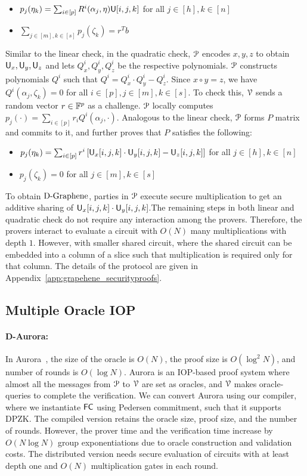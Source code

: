 \begin{itemize}
	\item $p_j(\eta_k) = \sum_{i\in[p]} R^i(\alpha_j, \eta) \mathsf{U}[i,j,k]$ for all $j \in [h], k \in [n]$
	\item $\sum_{j\in [m], k\in [s]} p_j (\zeta_k) = r^Tb$
\end{itemize}
%
Similar to the linear check, in the quadratic check, $\mathcal{P}$ encodes $x,y,z$ to obtain $\mathsf{U}_x, \mathsf{U}_y, \mathsf{U}_z$ and lets $Q^i_x, Q^i_y, Q^i_z$  be the respective polynomials. $\mathcal{P}$ constructs polynomials $Q^i$ such that $Q^i = Q^i_x\cdot Q^i_y - Q^i_z$. Since $x\circ y = z$, we have $Q^i(\alpha_j,\zeta_k) = 0$ for all $i\in[p], j\in[m], k\in[s]$. To check this, $\mathcal{V}$ sends a random vector $r\in \mathbb{F}^p$ as a challenge. $\mathcal{P}$ locally computes $p_j(\cdot) = \sum_{i \in [p]} r_i Q^i(\alpha_j, \cdot)$. Analogous to the linear check, $\mathcal{P}$ forms $P$ matrix and commits to it, and further proves that $P$ satisfies the following:
\begin{itemize}
	\item $p_j(\eta_k) = \sum_{i\in[p]} r^i \left[\mathsf{U}_x[i,j,k] \cdot \mathsf{U}_y[i,j,k] - \mathsf{U}_z[i,j,k]\right]$ for all $j \in [h], k \in [n]$
	\item $p_j (\zeta_k) = 0$ for all $j \in [m], k \in [s]$
\end{itemize}
%
To obtain $\text{D-Graphene}$, parties in $\mathcal{P}$ execute secure multiplication to get an additive sharing of $\mathsf{U}_x[i,j,k] \cdot \mathsf{U}_y[i,j,k]$.The remaining steps in both linear and quadratic check do not require any interaction among the provers. Therefore, the provers interact to evaluate a circuit with $O(N)$ many multiplications with depth $1$. However, with smaller shared circuit, where the shared circuit can be embedded into a
column of a slice such that multiplication is required only for that column.
The details of the protocol are given in Appendix~\ref{app:grapehene_securityproofs}.


\subsection{Multiple Oracle IOP}
\paragraph*{D-Aurora:}
In Aurora~\cite{aurora}, the size of the oracle is $O(N)$, the proof size is $O(\log^2 N)$, and number of rounds is $O(\log N)$. Aurora is an IOP-based proof system where almost all the messages from $\mathcal{P}$ to $\mathcal{V}$ are set as oracles, and $\mathcal{V}$ makes oracle-queries to complete the verification.
We can convert Aurora using our compiler, where we instantiate $\mathsf{FC}$ using Pedersen commitment, such that it supports DPZK. The compiled version retains the oracle size, proof size, and the number of rounds. However, the prover time and the verification time increase by $O(N\log N)$ group exponentiations due to oracle construction and validation costs. The distributed version needs secure evaluation of circuits with at least depth one and $O(N)$ multiplication gates in each round.
